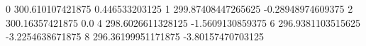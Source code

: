 0 300.610107421875 0.446533203125
1 299.87408447265625 -0.28948974609375
2 300.16357421875 0.0
4 298.6026611328125 -1.5609130859375
6 296.9381103515625 -3.2254638671875
8 296.36199951171875 -3.80157470703125
